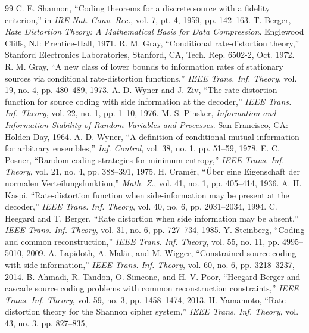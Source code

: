 \documentclass[11pt,onecolumn]{IEEEtran}
\begin{document}
\begin{thebibliography}{99}
 C. E. Shannon, ``Coding theorems for a discrete source
with a fidelity criterion,'' in \emph{IRE Nat. Conv. Rec.}, vol. 7, pt. 4, 1959,
pp. 142--163.
 T. Berger, \emph{Rate Distortion Theory: A Mathematical
Basis for Data Compression}. Englewood Cliffs, NJ: Prentice-Hall, 1971.
 R. M. Gray, ``Conditional rate-distortion theory,''
Stanford Electronics Laboratories, Stanford, CA, Tech. Rep. 6502-2, Oct. 1972.
 R. M. Gray, ``A new class of lower bounds to information
rates of stationary sources via conditional rate-distortion functions,''
\emph{IEEE Trans. Inf. Theory}, vol. 19, no. 4, pp. 480--489, 1973.
 A. D. Wyner and J. Ziv, ``The rate-distortion function
for source coding with side information at the decoder,'' \emph{IEEE Trans.
Inf. Theory}, vol. 22, no. 1, pp. 1--10, 1976.
 M. S. Pinsker, \emph{Information and Information
Stability of Random Variables and Processes}. San Francisco, CA:
Holden-Day, 1964.
 A. D. Wyner, ``A definition of conditional mutual
information for arbitrary ensembles,'' \emph{Inf. Control}, vol. 38,
no. 1, pp. 51--59, 1978.
 E. C. Posner, ``Random coding strategies for minimum
entropy,'' \emph{IEEE Trans. Inf. Theory}, vol. 21, no. 4, pp. 388--391,
1975.
 H. Cram\'er, ``\"Uber eine Eigenschaft der normalen
Verteilungsfunktion,'' \emph{Math. Z.}, vol. 41, no. 1, pp. 405--414,
1936.
 A. H. Kaspi, ``Rate-distortion function when
side-information may be present at the decoder,'' \emph{IEEE Trans. Inf.
Theory}, vol. 40, no. 6, pp. 2031--2034, 1994.
 C. Heegard and T. Berger, ``Rate distortion when
side information may be absent,'' \emph{IEEE Trans. Inf. Theory}, vol. 31,
no. 6, pp. 727--734, 1985.
 Y. Steinberg, ``Coding and common reconstruction,''
\emph{IEEE Trans. Inf. Theory}, vol. 55, no. 11, pp. 4995--5010, 2009.
 A. Lapidoth, A. Mal\"ar, and M. Wigger, ``Constrained
source-coding with side information,'' \emph{IEEE Trans. Inf. Theory},
vol. 60, no. 6, pp. 3218--3237, 2014.
 B. Ahmadi, R. Tandon, O. Simeone, and H. V. Poor,
``Heegard-Berger and cascade source coding problems with common reconstruction
constraints,'' \emph{IEEE Trans. Inf. Theory}, vol. 59, no. 3,
pp. 1458--1474, 2013.
 H. Yamamoto, ``Rate-distortion theory for the Shannon
cipher system,'' \emph{IEEE Trans. Inf. Theory}, vol. 43, no. 3, pp. 827--835,

\end{thebibliography}
\end{document}
